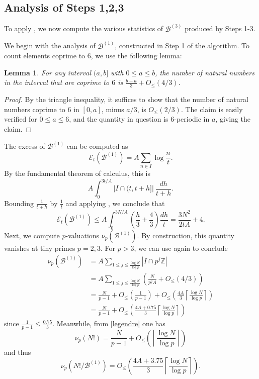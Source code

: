 \documentclass[12pt,a4paper,reqno]{amsart}
\numberwithin{equation}{section}
\theoremstyle{plain}
\newtheorem{lemma}[theorem]{Lemma}
\theoremstyle{definition}
\newcommand\Z{\mathbb{Z}}
\newcommand\tuple{{\mathcal B}}
\newcommand\excess{{\mathcal{E}}}
\begin{document}
\subsection{Analysis of Steps 1,2,3}

To apply  , we now compute the various statistics of $\tuple^{(3)}$ produced by Steps 1-3.

We begin with the analysis of $\tuple^{(1)}$, constructed in Step 1 of the algorithm.  To count elements coprime to $6$, we use the following lemma:

\begin{lemma}\label{lit}  For any interval $(a,b]$ with $0 \leq a \leq b$, the number of natural numbers in the interval that are coprime to $6$ is $\frac{b-a}{3} + O_{\leq}(4/3)$.
\end{lemma}

\begin{proof}  By the triangle inequality, it suffices to show that the number of natural numbers coprime to $6$ in $[0,a]$, minus $a/3$, is $O_{\leq}(2/3)$.  The claim is easily verified for $0 \leq a \leq 6$, and the quantity in question is $6$-periodic in $a$, giving the claim.
\end{proof}

The excess of $\tuple^{(1)}$ can be computed as
$$ \excess_t(\tuple^{(1)}) = A \sum_{n \in I} \log \frac{n}{t}.$$
By the fundamental theorem of calculus, this is
$$ A \int_0^{3t/A} |I \cap (t, t+h]|\ \frac{dh}{t+h}.$$
Bounding $\frac{1}{t+h}$ by $\frac{1}{t}$ and applying , we conclude that
\begin{equation}\label{excess1-bound}
 \excess_t(\tuple^{(1)}) \leq A \int_0^{3N/A} \left(\frac{h}{3} + \frac{4}{3}\right) \frac{dh}{t} = \frac{3N^2}{2tA} + 4.
\end{equation}
Next, we compute $p$-valuations $\nu_p(\tuple^{(1)})$.  By construction, this quantity vanishes at tiny primes $p=2,3$.  For $p>3$, we can use  again to conclude
\begin{align*}
  \nu_p(\tuple^{(1)}) &= A \sum_{1 \leq j \leq \frac{\log N}{\log p}} |I \cap p^j \Z| \\
  &= A \sum_{1 \leq j \leq \frac{\log N}{\log p}} \left(\frac{N}{p^j A} + O_{\leq}(4/3)\right) \\
  &= \frac{N}{p-1} + O_{\leq}\left(\frac{1}{p-1}\right)
  + O_{\leq}\left(\frac{4A}{3} \left\lceil \frac{\log N}{\log p}  \right\rceil\right) \\
  &= \frac{N}{p-1} 
  + O_{\leq}\left(\frac{4A+0.75}{3} \left\lceil \frac{\log N}{\log p}  \right\rceil\right) 
\end{align*}
since $\frac{1}{p-1} \leq \frac{0.75}{3}$.
Meanwhile, from \eqref{legendre} one has
$$ \nu_p(N!) = \frac{N}{p-1} + O_{\leq}\left(\left\lceil \frac{\log N}{\log p}  \right\rceil\right)$$
and thus
\begin{equation}\label{nup} 
  \nu_p(N!/\tuple^{(1)}) =  
O_{\leq}\left(\frac{4A+3.75}{3} \left\lceil \frac{\log N}{\log p}  \right\rceil\right).
\end{equation}
\end{document}
